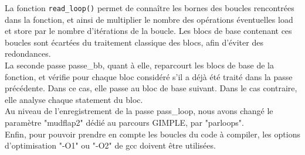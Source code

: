 La fonction \verb#read_loop()# permet de connaître les bornes des boucles rencontrées dans la fonction, et ainsi de multiplier le nombre des opérations éventuelles load et store par le nombre d'itérations de la boucle. Les blocs de base contenant ces boucles sont écartées du traitement classique des blocs, afin d'éviter des redondances.\\

La seconde passe passe\_bb, quant à elle, reparcourt les blocs de base de la fonction, et vérifie pour chaque bloc considéré s'il a déjà été traité dans la passe précédente. Dans ce cas, elle passe au bloc de base suivant. Dans le cas contraire, elle analyse chaque statement du bloc.\\ 

Au niveau de l'enregistrement de la passe pass\_loop, nous avons changé le paramètre "mudflap2" dédié au parcours GIMPLE, par "parloops".\\
Enfin, pour pouvoir prendre en compte les boucles du code à compiler, les options d'optimisation "-O1" ou "-O2" de gcc doivent être utilisées.


